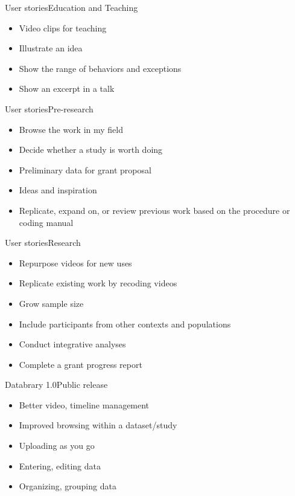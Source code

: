 \documentclass[aspectratio=169,14pt]{beamer}
\begin{document}
\begin{frame}{User stories}{Education and Teaching}
	\begin{itemize}
		\item Video clips for teaching
		\item Illustrate an idea
		\item Show the range of behaviors and exceptions
		\item Show an excerpt in a talk
	\end{itemize}
\end{frame}
\begin{frame}{User stories}{Pre-research}
	\begin{itemize}
		\item Browse the work in my field
		\item Decide whether a study is worth doing
		\item Preliminary data for grant proposal
		\item Ideas and inspiration
		\item Replicate, expand on, or review previous work based on the procedure or coding manual
	\end{itemize}
\end{frame}
\begin{frame}{User stories}{Research}
	\begin{itemize}
		\item Repurpose videos for new uses
		\item Replicate existing work by recoding videos
		\item Grow sample size
		\item Include participants from other contexts and populations
		\item Conduct integrative analyses
		\item Complete a grant progress report
	\end{itemize}
\end{frame}

\begin{frame}{Databrary 1.0}{Public release}
	\begin{itemize}
		\item Better video, timeline management
		\item Improved browsing within a dataset/study
		\item Uploading as you go
		\item Entering, editing data
		\item Organizing, grouping data
	\end{itemize}
\end{frame}
\end{document}
